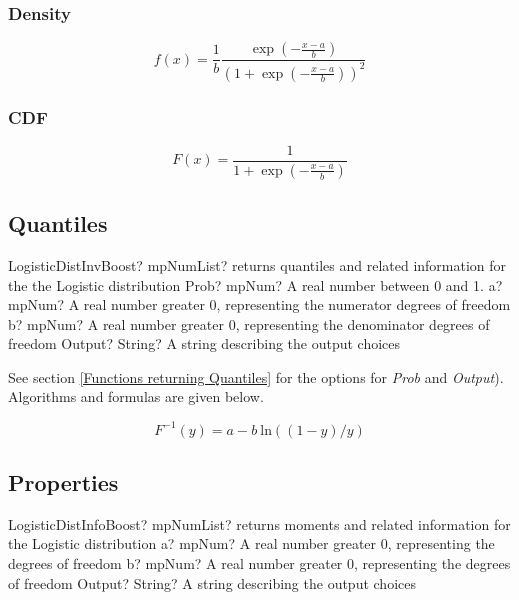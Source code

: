 \subsubsection{Density}
\label{LogisticDistributionDensity}

\begin{equation} 
	f(x)= \frac{1}{b} \frac{\exp \left(-\frac{x-a}{b}\right)}{\left(1+\exp \left(-\frac{x-a}{b}\right)\right)^2}
\end{equation}


\subsubsection{CDF}
\label{LogisticDistributionCDF}

\begin{equation} 
	F(x)= \frac{1}{1+\exp \left(-\frac{x-a}{b}\right)}
\end{equation}


\subsection{Quantiles}
\begin{mpFunctionsExtract}
	\mpFunctionFour
	{LogisticDistInvBoost? mpNumList? returns quantiles and related information for the the Logistic distribution}
	{Prob? mpNum? A real number between 0 and 1.}
	{a? mpNum? A real number greater 0, representing the numerator  degrees of freedom}
	{b? mpNum? A real number greater 0, representing the denominator degrees of freedom}
	{Output? String? A string describing the output choices}
\end{mpFunctionsExtract}

See section \ref{Functions returning Quantiles} for the options for  {\itshape\sffamily Prob} and {\itshape\sffamily Output}). Algorithms and formulas are given below.

\begin{equation} 
	F^{-1}(y)= a-b \: \text{ln}\left((1-y)/y\right)
\end{equation}



\subsection{Properties}
\label{LogisticDistributionProperties}

\begin{mpFunctionsExtract}
	\mpFunctionThree
	{LogisticDistInfoBoost? mpNumList? returns moments and related information for the Logistic distribution}
	{a? mpNum? A real number greater 0, representing the degrees of freedom}
	{b? mpNum? A real number greater 0, representing the degrees of freedom}
	{Output? String? A string describing the output choices}
\end{mpFunctionsExtract}

